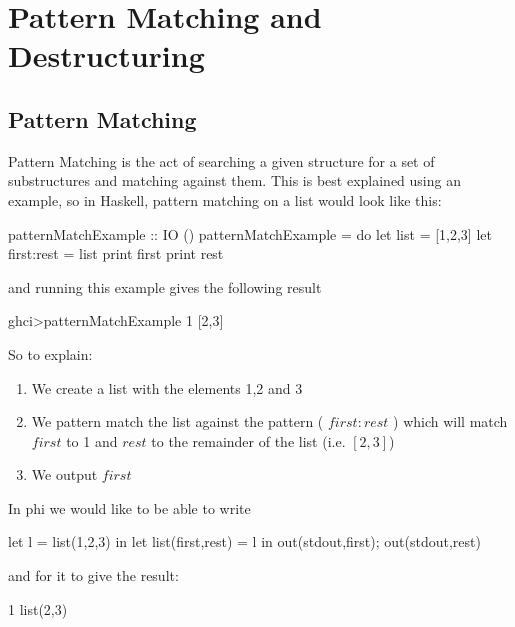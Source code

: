 \section{Pattern Matching and Destructuring}
\label{sec:patterns}

\subsection{Pattern Matching}
Pattern Matching is the act of searching a given structure for a set of substructures and matching against them. This is best explained using an example, so in Haskell, pattern matching on a list would look like this:

\label{example:pmatchhask}
\begin{code}
patternMatchExample :: IO ()
patternMatchExample = do
        let list = [1,2,3]
        let first:rest = list
        print first
        print rest
\end{code}
and running this example gives the following result
\begin{code}
    ghci>patternMatchExample 
    1
    [2,3]
\end{code}

So to explain:
\begin{enumerate}
    \item We create a list with the elements 1,2 and 3
    \item We pattern match the list against the pattern ( $first:rest$ ) which will match $first$ to 1 and $rest$ to the remainder of the list (i.e. $[2,3]$)
    \item We output $first$
\end{enumerate}

In phi we would like to be able to write

\begin{code}
let l = list(1,2,3) in
    let list(first,rest) = l in
        out(stdout,first);
        out(stdout,rest)
\end{code}

and for it to give the result:

\begin{code}
1
list(2,3)
\end{code}

